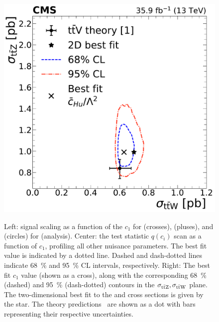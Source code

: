 \begin{landscape}
\begin{figure}
{        \includegraphics[height=\textheight]{figures/thirteen-TeV/NP/2D/ttZ_ttW_2D_1D_cHu}
      }
    \setlength{\capwidth}{14cm}
    \caption[Profile likelihood, $\mu(c_1)$, and best fit $c_1$ for \cHu (\thirteenTeV)]{Left: signal scaling as a function of the $c_1$ for \ttW (crosses), \ttZ (pluses), and \ttH (circles) for \cHu (\thirteenTeV analysis). Center: the test statistic $q(c_i)$ scan as a function of $c_1$, profiling all other nuisance parameters. The best fit value is indicated by a dotted line. Dashed and dash-dotted lines indicate \SI{68}{\percent} and \SI{95}{\percent} CL intervals, respectively. Right: The best fit $c_1$ value (shown as a cross), along with the corresponding \SI{68}{\percent} (dashed) and \SI{95}{\percent} (dash-dotted) contours in the $\sigma_{\text{t}\bar{\text{t}}\text{Z}}, \sigma_{\text{t}\bar{\text{t}}\text{W}}$ plane. The two-dimensional best fit to the \ttW and \ttZ cross sections is given by the star. The theory predictions~\cite{deFlorian:2016spz} are shown as a dot with bars representing their respective uncertainties.}
    \label{fig:results-cHu}
  \end{figure}
\end{landscape}

\begin{table}
  
\end{table}
\begin{table}
  
\end{table}

